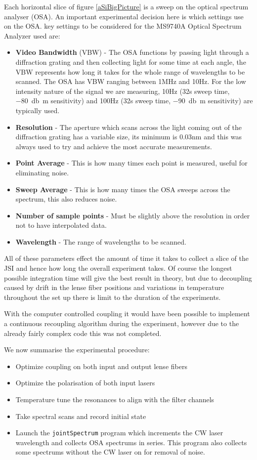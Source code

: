 Each horizontal slice of figure \ref{aSiBigPicture}   is a sweep on the optical spectrum analyser (OSA). An important experimental decision here is which settings use on the OSA. key settings to be considered for the MS9740A Optical Spectrum Analyzer used are:
\begin{itemize}
	\item \textbf{Video Bandwidth} (VBW) - The OSA functions by passing light through a diffraction grating and then collecting light for some time at each angle, the VBW represents how long it takes for the whole range of wavelengths to be scanned. The OSA has VBW ranging between 1MHz and 10Hz. For the low intensity nature of the signal we are measuring, 10Hz (32s sweep time, \SI{-80}{\decibel\m} sensitivity) and 100Hz (32s sweep time, \SI{-90}{\decibel\m} sensitivity) are typically used.
	\item \textbf{Resolution} - The aperture  which scans across the light coming out of the diffraction grating has a variable size, its minimum is 0.03nm and this was always used to try and achieve the most accurate measurements. 
	\item \textbf{Point Average} - This is how many times each point is measured, useful for eliminating noise.
	\item \textbf{Sweep Average} - This is how many times the OSA sweeps across the spectrum, this also reduces noise. 
	\item \textbf{Number of sample points} - Must be slightly above the resolution in order not to have interpolated data.
	\item \textbf{Wavelength} - The range of wavelengths to be scanned.
\end{itemize}

All of these parameters effect the amount of time it takes to collect a slice of the JSI and hence how long the overall experiment takes. Of course the longest possible integration time will give the best result in theory, but due to decoupling caused by drift in the lense fiber positions and variations in temperature throughout the set up there is limit to the duration of the experiments. 

With the computer controlled coupling it would have been possible to implement a continuous recoupling algorithm during the experiment, however due to the already fairly complex code this was not completed. 

We now summarise the experimental procedure: 

\begin{itemize}
	\item Optimize coupling on both input and output lense fibers
	\item Optimize the polarisation of both input lasers
	\item Temperature tune the resonances to align with the filter channels
	\item Take spectral scans and record initial state
	\item Launch the \lstinline$jointSpectrum$ program which increments the CW laser wavelength and collects OSA spectrums in series. This program also collects some spectrums without the CW laser on for removal of noise.
\end{itemize}

